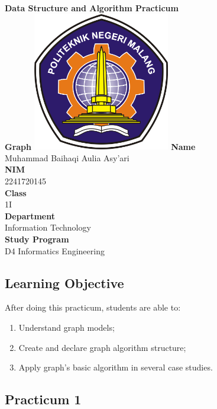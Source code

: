 \documentclass[12pt,titlepage]{article}
\newcommand{\vSubject}{Data Structure and Algorithm Practicum}
\newcommand{\vSubtitle}{Graph}
\newcommand{\vName}{Muhammad Baihaqi Aulia Asy'ari}
\newcommand{\vNIM}{2241720145}
\newcommand{\vClass}{1I}
\newcommand{\vDepartment}{Information Technology}
\newcommand{\vStudyProgram}{D4 Informatics Engineering}
\begin{document}
\begin{titlepage}
    \centering
    \vfill
    {\bfseries\LARGE
        \vSubject\\
        \vskip0.25cm
        \vSubtitle
    }
    \vfill
    \includegraphics[width=6cm]{images/polinema-logo.png}
    \vfill
    {
        \textbf{Name}\\
        \vName\\
        \vskip0.5cm
        \textbf{NIM}\\
        \vNIM\\
        \vskip0.5cm
        \textbf{Class}\\
        \vClass\\
        \vskip0.5cm
        \textbf{Department}\\
        \vDepartment\\
        \vskip0.5cm
        \textbf{Study Program}\\
        \vStudyProgram
    }
\end{titlepage}

\newpage

\setcounter{section}{1}
\subsection{Learning Objective}
After doing this practicum, students are able to:
\begin{enumerate}
    \item Understand graph models;
    \item Create and declare graph algorithm structure;
    \item Apply graph's basic algorithm in several case studies.
\end{enumerate}

\subsection{Practicum 1}
\end{document}
